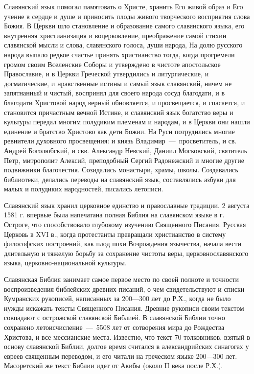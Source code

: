\documentclass[11pt,a4paper,oneside]{memoir}
\begin{document}
    Славянский язык помогал памятовать о Христе, хранить Его живой образ и Его учение в сердце и душе и приносить плоды живого творческого восприятия слова Божия. В Церкви шло становление и образование самого славянского языка, его внутренняя христианизация и воцерковление, преображение самой стихии славянской мысли и слова, славянского голоса, души народа, На долю русского народа выпало редкое счастье принять христианство тогда, когда прогремели громом своим Вселенские Соборы и утверждено в чистоте апостольское Православие, и в Церкви Греческой утвердились и литургические, и догматические, и нравственные истины и самый язык славянский, ничем не запятнанный и чистый, воспринял для своего народа сосуд благодати, и в благодати Христовой народ верный обновляется, и просвещается, и спасается, и становится причастным вечной Истине, и славянский язык богатство веры и культуры передал многим полудиким племенам и народам, и в Церкви они нашли единение и братство Христово как дети Божии. На Руси потрудились многие ревнители духовного просвещения: и князь Владимир~---~просветитель, и св. Андрей Боголюбский, и свв. Александр Невский, Даниил Московский, святитель Петр, митрополит Алексий, преподобный Сергий Радонежский и многие другие подвижники благочестия. Созидались монастыри, храмы, школы. Создавались библиотеки, делались переводы на славянский язык, составлялись азбуки для малых и полудиких народностей, писались летописи.
    
    Славянский язык хранил церковное единство и православные традиции. 2 августа 1581 г. впервые была напечатана полная Библия на славянском языке в г. Остроге, что способствовало глубокому изучению Священного Писания. Русская Церковь в XVI в., когда протестанты превращали христианство в систему философских построений, как плод похи Возрождения язычества, начала вести длительную и тяжелую борьбу за сохранение чистоты веры, церковнославянского языка, церковно-национальной культуры.
    
    Славянская Библия занимает самое первое место по своей полноте и точности воспроизведения библейских древних писаний, о чем свидетельствуют и списки Кумранских рукописей, написанных за 200---300 лет до Р.Х., когда не было нужды искажать тексты Священного Писания. Древние рукописи своим текстом совпадают с острожской славянской Библией. В славянской Библии точно сохранено летоисчисление~---~5508 лет от сотворения мира до Рождества Христова, и все мессианские места. Известно, что текст 70 толковников, взятый в основу славянской Библии, долгое время считался в александрийских синагогах у евреев священным переводом, и его читали на греческом языке 200---300 лет. Масоретский же текст Библии идет от Акибы (около II века после Р.Х.).
    
\end{document}
